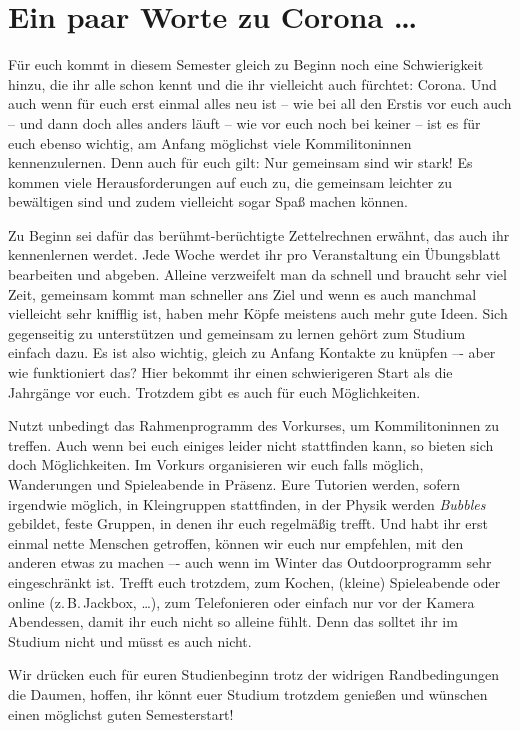 \section{Ein paar Worte zu Corona \ldots}

Für euch kommt in diesem Semester gleich zu Beginn noch eine Schwierigkeit hinzu, die ihr alle schon kennt und die ihr vielleicht auch fürchtet: Corona.
Und auch wenn für euch erst einmal alles neu ist -- wie bei all den Erstis vor euch auch -- und dann doch alles anders läuft -- wie vor euch noch bei keiner -- ist es für euch ebenso wichtig, am Anfang möglichst viele Kommilitoninnen kennenzulernen. Denn auch für euch gilt: Nur gemeinsam sind wir stark! Es kommen viele Herausforderungen auf euch zu, die gemeinsam leichter zu bewältigen sind und zudem vielleicht sogar Spaß machen können.

Zu Beginn sei dafür das berühmt-berüchtigte Zettelrechnen erwähnt, das auch ihr kennenlernen werdet. Jede Woche werdet ihr pro Veranstaltung ein Übungsblatt bearbeiten und abgeben. Alleine verzweifelt man da schnell und braucht sehr viel Zeit, gemeinsam kommt man schneller ans Ziel und wenn es auch manchmal vielleicht sehr knifflig ist, haben mehr Köpfe meistens auch mehr gute Ideen. Sich gegenseitig zu unterstützen und gemeinsam zu lernen gehört zum Studium einfach dazu. Es ist also wichtig, gleich zu Anfang Kontakte zu knüpfen –- aber wie funktioniert das? Hier bekommt ihr einen schwierigeren Start als die Jahrgänge vor euch. Trotzdem gibt es auch für euch Möglichkeiten.

Nutzt unbedingt das Rahmenprogramm des Vorkurses, um Kommilitoninnen zu treffen. Auch wenn bei euch einiges leider nicht stattfinden kann, so bieten sich doch Möglichkeiten. Im Vorkurs organisieren wir euch falls möglich, Wanderungen und Spieleabende in Präsenz.
Eure Tutorien werden, sofern irgendwie möglich, in Kleingruppen stattfinden, in der Physik werden \emph{Bubbles} gebildet, feste Gruppen, in denen ihr euch regelmäßig trefft.
Und habt ihr erst einmal nette Menschen getroffen, können wir euch nur empfehlen, mit den anderen etwas zu machen –- auch wenn im Winter das Outdoorprogramm sehr eingeschränkt ist. Trefft euch trotzdem, zum Kochen, (kleine) Spieleabende oder online (z.\,B.\,Jackbox, \ldots), zum Telefonieren oder einfach nur vor der Kamera Abendessen, damit ihr euch nicht so alleine fühlt. Denn das solltet ihr im Studium nicht und müsst es auch nicht.

Wir drücken euch für euren Studienbeginn trotz der widrigen Randbedingungen die Daumen, hoffen, ihr könnt euer Studium trotzdem genießen und wünschen einen möglichst guten Semesterstart!